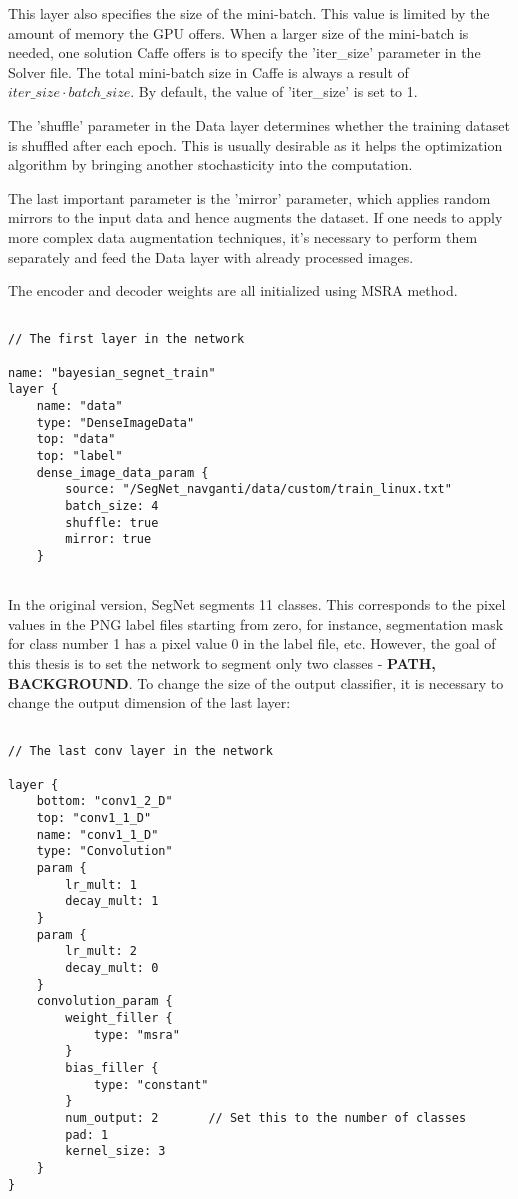 This layer also specifies the size of the mini-batch. This value is limited by the amount of memory the GPU offers. When a larger size of the mini-batch is needed, one solution Caffe offers is to specify the 'iter\_size' parameter in the Solver file. The total mini-batch size in Caffe is always a result of $iter\_size \cdot batch\_size$. By default, the value of 'iter\_size' is set to 1.

The 'shuffle' parameter in the Data layer determines whether the training dataset is shuffled after each epoch. This is usually desirable as it helps the optimization algorithm by bringing another stochasticity into the computation. 

The last important parameter is the 'mirror' parameter, which applies random mirrors to the input data and hence augments the dataset. If one needs to apply more complex data augmentation techniques, it's necessary to perform them separately and feed the Data layer with already processed images.

The encoder and decoder weights are all initialized using MSRA method.  

\begin{lstlisting}

// The first layer in the network

name: "bayesian_segnet_train"
layer {
	name: "data"
	type: "DenseImageData"
	top: "data"
	top: "label"
	dense_image_data_param {
		source: "/SegNet_navganti/data/custom/train_linux.txt"
		batch_size: 4   			    			
		shuffle: true
		mirror: true	
	}
	
\end{lstlisting}	 

In the original version, SegNet segments 11 classes. This corresponds to the pixel values in the PNG label files starting from zero, for instance, segmentation mask for class number 1 has a pixel value 0 in the label file, etc. However, the goal of this thesis is to set the network to segment only two classes - \textbf{PATH, BACKGROUND}. To change the size of the output classifier, it is necessary to change the output dimension of the last layer:

\begin{lstlisting}

// The last conv layer in the network

layer {
	bottom: "conv1_2_D"
	top: "conv1_1_D"
	name: "conv1_1_D"
	type: "Convolution"
	param {
		lr_mult: 1
		decay_mult: 1
	}
	param {
		lr_mult: 2
		decay_mult: 0
	}
	convolution_param {
		weight_filler {
			type: "msra"
		}
		bias_filler {
			type: "constant"
		}
		num_output: 2		// Set this to the number of classes
		pad: 1
		kernel_size: 3
	}
}

\end{lstlisting}

